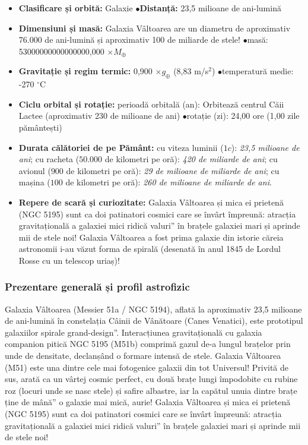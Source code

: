 \begin{tcolorbox}[orbitardata, title={\textbf{Repere esențiale: Galaxia Vâltoarea (M51)}}]
\small
\begin{itemize}[leftmargin=1.4em, itemsep=2pt, topsep=2pt]
  \item \textbf{Clasificare și orbită:} Galaxie \quad$\bullet$\quad \textbf{Distanță:} 23,5 milioane de ani-lumină
  \item \textbf{Dimensiuni și masă:} Galaxia Vâltoarea are un diametru de aproximativ 76.000 de ani-lumină și aproximativ 100 de miliarde de stele! \quad$\bullet$\quad masă: 53000000000000000,000 $\times M_\oplus$
  \item \textbf{Gravitație și regim termic:} 0,900 $\times g_\oplus$ (8,83 m/s$^2$) \quad$\bullet$\quad temperatură medie: -270 $^\circ$C
  \item \textbf{Ciclu orbital și rotație:} perioadă orbitală (an): Orbitează centrul Căii Lactee (aproximativ 230 de milioane de ani) \quad$\bullet$\quad rotație (zi): 24,00 ore (1,00 zile pământești)
  \item \textbf{Durata călătoriei de pe Pământ:} cu viteza luminii ($1c$): \emph{23,5 milioane de ani}; cu racheta ($50.000$ de kilometri pe oră): \emph{420 de miliarde de ani}; cu avionul ($900$ de kilometri pe oră): \emph{29 de milioane de miliarde de ani}; cu mașina ($100$ de kilometri pe oră): \emph{260 de milioane de miliarde de ani}.
  \item \textbf{Repere de scară și curiozitate:} Galaxia Vâltoarea și mica ei prietenă (NGC 5195) sunt ca doi patinatori cosmici care se învârt împreună: atracția gravitațională a galaxiei mici ridică \quotedblbase{}valuri\textquotedblright{} în brațele galaxiei mari și aprinde mii de stele noi! Galaxia Vâltoarea a fost prima galaxie din istorie căreia astronomii i-au văzut forma de spirală (desenată în anul 1845 de Lordul Rosse cu un telescop uriaș)!
\end{itemize}
\end{tcolorbox}

\subsubsection*{Prezentare generală și profil astrofizic}
Galaxia Vâltoarea (Messier 51a / NGC 5194), aflată la aproximativ 23,5 milioane de ani-lumină în constelația Câinii de Vânătoare (Canes Venatici), este prototipul galaxiilor spirale \quotedblbase{}grand-design\textquotedblright{}. Interacțiunea gravitațională cu galaxia companion pitică NGC 5195 (M51b) comprimă gazul de-a lungul brațelor prin unde de densitate, declanșând o formare intensă de stele. Galaxia Vâltoarea (M51) este una dintre cele mai fotogenice galaxii din tot Universul! Privită de sus, arată ca un vârtej cosmic perfect, cu două brațe lungi împodobite cu rubine roz (locuri unde se nasc stele) și safire albastre, iar la capătul unuia dintre brațe ține \quotedblbase{}de mână\textquotedblright{} o galaxie mai mică, aurie! Galaxia Vâltoarea și mica ei prietenă (NGC 5195) sunt ca doi patinatori cosmici care se învârt împreună: atracția gravitațională a galaxiei mici ridică \quotedblbase{}valuri\textquotedblright{} în brațele galaxiei mari și aprinde mii de stele noi!

